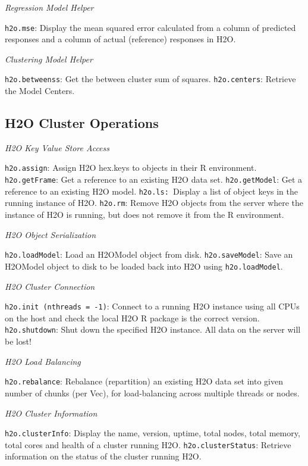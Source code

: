 {{{{{\medskip
\emph{Regression Model Helper}\par
{\texttt{h2o.mse}}: Display the mean squared error calculated from a column of predicted responses and a column of actual (reference) responses in H2O. 

\medskip
\emph{Clustering Model Helper}\par
{\texttt{h2o.betweenss}}: Get the between cluster sum of squares. 
{\texttt{h2o.centers}}: Retrieve the Model Centers. 

\subsection{H2O Cluster Operations}
\medskip
\emph{H2O Key Value Store Access}\par
{\texttt{h2o.assign}}: Assign H2O hex.keys to objects in their R environment. 
{\texttt{h2o.getFrame}}: Get a reference to an existing H2O data set.  
{\texttt{h2o.getModel}}: Get a reference to an existing H2O model.  
{\texttt{h2o.ls: }}Display a list of object keys in the running instance of H2O.  
{\texttt{h2o.rm}}: Remove H2O objects from the server where the instance of H2O is running, but does not remove it from the R environment. 

\medskip
\emph{H2O Object Serialization}\par
{\texttt{h2o.loadModel}}: Load an H2OModel object from disk. 
{\texttt{h2o.saveModel}}: Save an H2OModel object to disk to be loaded back into H2O using {\texttt{h2o.loadModel}}. 

\emph{H2O Cluster Connection}\par 
{\texttt{h2o.init (nthreads = -1)}}: Connect to a running H2O instance using all CPUs on the host and check the local H2O R package is the correct version. 
{\texttt{h2o.shutdown}}: Shut down the specified H2O instance. All data on the server will be lost! 

\medskip
\emph{H2O Load Balancing}\par
{\texttt{h2o.rebalance}}: Rebalance (repartition) an existing H2O data set into given number of chunks (per Vec), for load-balancing across multiple threads or nodes.  %

\medskip
\emph{H2O Cluster Information}\par
{\texttt{h2o.clusterInfo}}: Display the name, version, uptime, total nodes, total memory, total cores and health of a cluster running H2O. 
{\texttt{h2o.clusterStatus}}: Retrieve information on the status of the cluster running H2O. 

}}}}}
